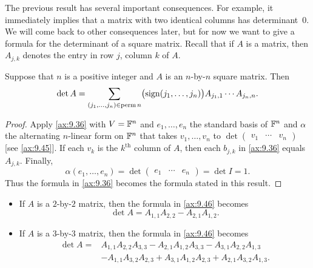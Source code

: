 The previous result has several important consequences. For example, it
immediately implies that a matrix with two identical columns has
determinant~$0$. We will come back to other consequences later, but for now we
want to give a formula for the determinant of a square matrix. Recall that if
$A$ is a matrix, then $A_{j,k}$ denotes the entry in row $j$, column $k$ of
$A$.

\begin{result}\label{ax:9.46}
Suppose that $n$ is a positive integer and $A$ is an $n$-by-$n$ square matrix.
Then
\[ \operatorname{det} A = \sum_{(j_1,\dots,j_n)\in\operatorname{perm} n}
   \bigl(\operatorname{sign}(j_1,\dots,j_n)\bigr)A_{j_1,1}\cdots A_{j_n,n}. \]
\end{result}

\begin{proof}
Apply \ref{ax:9.36} with $V=\mathbb{F}^n$ and $e_1,\dots,e_n$ the standard basis of
$\mathbb{F}^n$ and $\alpha$ the alternating $n$-linear form on $\mathbb{F}^n$ that takes
$v_1,\dots,v_n$ to $\det\begin{pmatrix} v_1 & \cdots & v_n \end{pmatrix}$ [see
\ref{ax:9.45}]. If each $v_k$ is the $k^{\text{th}}$ column of $A$, then each
$b_{j,k}$ in \ref{ax:9.36} equals $A_{j,k}$. Finally,
\[ \alpha(e_1,\dots,e_n) = \det\begin{pmatrix} e_1 & \cdots & e_n \end{pmatrix}
   = \det I = 1. \]
Thus the formula in \ref{ax:9.36} becomes the formula stated in this result.
\end{proof}

\begin{example}\label{ax:9.47}\leavevmode
\begin{itemize}
\item If $A$ is a $2$-by-$2$ matrix, then the formula in \ref{ax:9.46} becomes
  \[ \det A = A_{1,1}A_{2,2} - A_{2,1}A_{1,2}. \]
\item If $A$ is a $3$-by-$3$ matrix, then the formula in \ref{ax:9.46} becomes
  \begin{align*}
  \det A = {}&A_{1,1}A_{2,2}A_{3,3} - A_{2,1}A_{1,2}A_{3,3}
             - A_{3,1}A_{2,2}A_{1,3}\\
             &- A_{1,1}A_{3,2}A_{2,3} + A_{3,1}A_{1,2}A_{2,3}
             + A_{2,1}A_{3,2}A_{1,3}.
  \end{align*}
\end{itemize}
\end{example}

